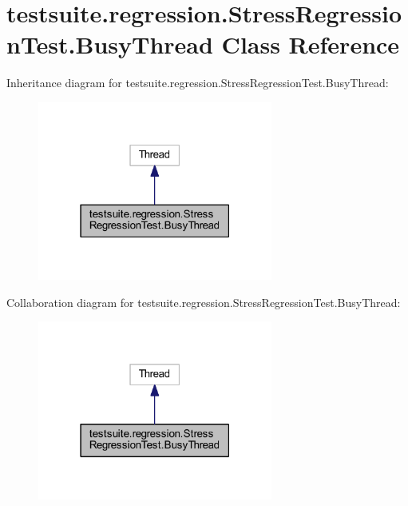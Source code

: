 \hypertarget{classtestsuite_1_1regression_1_1_stress_regression_test_1_1_busy_thread}{}\section{testsuite.\+regression.\+Stress\+Regression\+Test.\+Busy\+Thread Class Reference}
\label{classtestsuite_1_1regression_1_1_stress_regression_test_1_1_busy_thread}


Inheritance diagram for testsuite.\+regression.\+Stress\+Regression\+Test.\+Busy\+Thread\+:
\nopagebreak
\begin{figure}[H]
\begin{center}
\leavevmode
\includegraphics[width=219pt]{classtestsuite_1_1regression_1_1_stress_regression_test_1_1_busy_thread__inherit__graph}
\end{center}
\end{figure}


Collaboration diagram for testsuite.\+regression.\+Stress\+Regression\+Test.\+Busy\+Thread\+:
\nopagebreak
\begin{figure}[H]
\begin{center}
\leavevmode
\includegraphics[width=219pt]{classtestsuite_1_1regression_1_1_stress_regression_test_1_1_busy_thread__coll__graph}
\end{center}
\end{figure}
